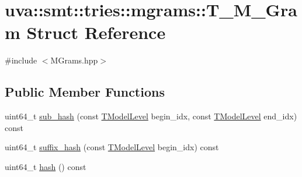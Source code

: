 \hypertarget{structuva_1_1smt_1_1tries_1_1mgrams_1_1_t___m___gram}{}\section{uva\+:\+:smt\+:\+:tries\+:\+:mgrams\+:\+:T\+\_\+\+M\+\_\+\+Gram Struct Reference}
\label{structuva_1_1smt_1_1tries_1_1mgrams_1_1_t___m___gram}


{\ttfamily \#include $<$M\+Grams.\+hpp$>$}

\subsection*{Public Member Functions}
\begin{DoxyCompactItemize}
\item 
uint64\+\_\+t \hyperlink{structuva_1_1smt_1_1tries_1_1mgrams_1_1_t___m___gram_a87d9852f45d1302d444d3b675ac208ee}{sub\+\_\+hash} (const \hyperlink{namespaceuva_1_1smt_1_1tries_a20577a44b3a42d26524250634379b7cb}{T\+Model\+Level} begin\+\_\+idx, const \hyperlink{namespaceuva_1_1smt_1_1tries_a20577a44b3a42d26524250634379b7cb}{T\+Model\+Level} end\+\_\+idx) const 
\item 
uint64\+\_\+t \hyperlink{structuva_1_1smt_1_1tries_1_1mgrams_1_1_t___m___gram_ad881b8fd36556fe70d67eeea21a0c878}{suffix\+\_\+hash} (const \hyperlink{namespaceuva_1_1smt_1_1tries_a20577a44b3a42d26524250634379b7cb}{T\+Model\+Level} begin\+\_\+idx) const 
\item 
uint64\+\_\+t \hyperlink{structuva_1_1smt_1_1tries_1_1mgrams_1_1_t___m___gram_a59fec2addc530f943801a49a44e64fa9}{hash} () const 
\end{DoxyCompactItemize}
